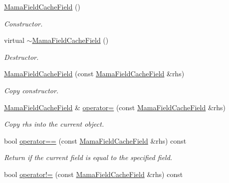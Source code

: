 \begin{DoxyCompactItemize}
\item 
\hyperlink{classWombat_1_1MamaFieldCacheField_ae8ee6f655d57d6f01ca90573fa292308}{MamaFieldCacheField} ()
\begin{DoxyCompactList}\small\item\em Constructor. \item\end{DoxyCompactList}\item 
virtual \hyperlink{classWombat_1_1MamaFieldCacheField_a959c4e16ec621a70d4cb917366b3ecda}{$\sim$MamaFieldCacheField} ()
\begin{DoxyCompactList}\small\item\em Destructor. \item\end{DoxyCompactList}\item 
\hyperlink{classWombat_1_1MamaFieldCacheField_afff140fb76e047923aa8479c8808a79a}{MamaFieldCacheField} (const \hyperlink{classWombat_1_1MamaFieldCacheField}{MamaFieldCacheField} \&rhs)
\begin{DoxyCompactList}\small\item\em Copy constructor. \item\end{DoxyCompactList}\item 
\hyperlink{classWombat_1_1MamaFieldCacheField}{MamaFieldCacheField} \& \hyperlink{classWombat_1_1MamaFieldCacheField_a7241e2da84e4894c53821f21dcd80062}{operator=} (const \hyperlink{classWombat_1_1MamaFieldCacheField}{MamaFieldCacheField} \&rhs)
\begin{DoxyCompactList}\small\item\em Copy rhs into the current object. \item\end{DoxyCompactList}\item 
bool \hyperlink{classWombat_1_1MamaFieldCacheField_a5cbfcf9063b0c4338c29601ef58d5e5d}{operator==} (const \hyperlink{classWombat_1_1MamaFieldCacheField}{MamaFieldCacheField} \&rhs) const 
\begin{DoxyCompactList}\small\item\em Return if the current field is equal to the specified field. \item\end{DoxyCompactList}\item 
bool \hyperlink{classWombat_1_1MamaFieldCacheField_a07b2c870f5a5e2c1e12567d9dafda9a2}{operator!=} (const \hyperlink{classWombat_1_1MamaFieldCacheField}{MamaFieldCacheField} \&rhs) const 

\end{DoxyCompactItemize}
